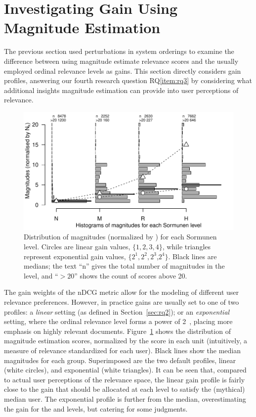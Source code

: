 
\section{Investigating Gain Using Magnitude Estimation}
\label{sec-rq3}

The previous section used perturbations in system orderings to examine
the difference between using magnitude estimate relevance scores and
the usually employed ordinal relevance levels as gains.
This section directly considers gain profiles, answering our fourth
research question RQ\ref{item:rq3} by considering what additional
insights magnitude estimation can provide into user perceptions of
relevance.


\begin{figure}[t]
  \centering
  \includegraphics[width=.7\linewidth]{figs/gains_ratios_all.pdf}
  \caption{Distribution of magnitudes (normalized by \nkn) for each Sormunen level.
    Circles are linear gain values, $\{1,2,3,4\}$, while triangles 
    represent exponential gain values, $\{2^1,2^2,2^3$,$2^4\}$.
    Black lines are medians; the text ``n'' gives the total number of magnitudes in the level, and ``$>20$'' shows
    the count of scores above 20.
  \label{fig:ratio-gain-values}
  }
\end{figure}


The gain weights of the nDCG metric allow for the modeling of
different user relevance preferences.
However, in practice gains are usually set to one of two profiles: a 
\emph{linear} setting (as defined in Section~\ref{sec:rq2}); or an
\emph{exponential} setting, where the ordinal relevance level
forms a power of 2~\cite{BurSha05}, placing more emphasis on highly
relevant documents.
Figure~\ref{fig:ratio-gain-values} shows the distribution of magnitude
estimation scores, normalized by the \nkn score in each unit (intuitively,
a measure of relevance standardized for each user).
Black lines show the median magnitudes for each group.
Superimposed are the two default profiles, linear (white circles), and
exponential (white triangles).
It can be seen that, compared to actual user perceptions of the
relevance space, the linear gain profile is fairly close to 
the gain that should be allocated at each level to satisfy the
(mythical) median user.
The exponential profile is further from the median, overestimating the
gain for the \rr and \hh levels, but catering for some judgments.

